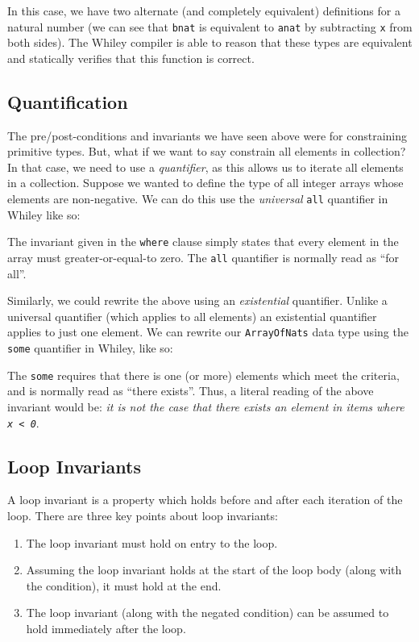 In this case, we have two alternate (and completely equivalent)
definitions for a natural number (we can see that \lstinline{bnat} is
equivalent to \lstinline{anat} by subtracting \lstinline{x} from both sides).
The Whiley compiler is able to reason that these types are equivalent
and statically verifies that this function is correct.

\subsection{Quantification}
The pre/post-conditions and invariants we have seen above were for constraining primitive types.  But, what if we want to say constrain all elements in collection?  In that case, we need to use a {\em quantifier}, as this allows us to iterate all elements in a collection.  Suppose we wanted to define the type of all integer arrays whose elements are non-negative.  We can do this use the {\em universal} \lstinline{all} quantifier in Whiley like so:



The invariant given in the \lstinline{where} clause simply states that every element in the array must greater-or-equal-to zero.  The \lstinline{all} quantifier is normally read as ``for all''.

Similarly, we could rewrite the above using an {\em existential} quantifier.  Unlike a universal quantifier (which applies to all elements) an existential quantifier applies to just one element.  We can rewrite our \lstinline{ArrayOfNats} data type using the \lstinline{some} quantifier in Whiley, like so:



The \lstinline{some} requires that there is one (or more) elements which meet the criteria, and is normally read as ``there exists''.  Thus, a literal reading of the above invariant would be: {\em it is not the case that there exists an element in items where \lstinline{x < 0}}.  

\subsection{Loop Invariants}
\label{loop_invariants}

A loop invariant is a property which
holds before and after each iteration of the loop.  There are three
key points about loop invariants:
\begin{enumerate}
\item The loop invariant must hold on entry to the loop.
\item Assuming the loop invariant holds at the start of the loop body
  (along with the condition), it must hold at the end.
\item The loop invariant (along with the negated condition) can be
  assumed to hold immediately after the loop.
\end{enumerate}

